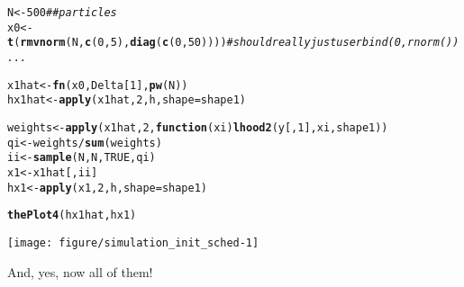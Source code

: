 \documentclass[11pt]{article}\usepackage[]{graphicx}\usepackage[]{color}
\makeatletter
\def\maxwidth{ %
  \ifdim\Gin@nat@width>\linewidth
    \linewidth
  \else
    \Gin@nat@width
  \fi
}
\newcommand{\hlnum}[1]{\textcolor[rgb]{0.686,0.059,0.569}{#1}}%
\newcommand{\hlcom}[1]{\textcolor[rgb]{0.678,0.584,0.686}{\textit{#1}}}%
\newcommand{\hlopt}[1]{\textcolor[rgb]{0,0,0}{#1}}%
\newcommand{\hlstd}[1]{\textcolor[rgb]{0.345,0.345,0.345}{#1}}%
\newcommand{\hlkwa}[1]{\textcolor[rgb]{0.161,0.373,0.58}{\textbf{#1}}}%
\newcommand{\hlkwb}[1]{\textcolor[rgb]{0.69,0.353,0.396}{#1}}%
\newcommand{\hlkwc}[1]{\textcolor[rgb]{0.333,0.667,0.333}{#1}}%
\newcommand{\hlkwd}[1]{\textcolor[rgb]{0.737,0.353,0.396}{\textbf{#1}}}%
\newenvironment{kframe}{%
 \def\at@end@of@kframe{}%
 \ifinner\ifhmode%
  \def\at@end@of@kframe{\end{minipage}}%
  \begin{minipage}{\columnwidth}%
 \fi\fi%
 \def\FrameCommand##1{\hskip\@totalleftmargin \hskip-\fboxsep
 \colorbox{shadecolor}{##1}\hskip-\fboxsep
     \hskip-\linewidth \hskip-\@totalleftmargin \hskip\columnwidth}%
 \MakeFramed {\advance\hsize-\width
   \@totalleftmargin\z@ \linewidth\hsize
   \@setminipage}}%
 {\par\unskip\endMakeFramed%
 \at@end@of@kframe}
\newenvironment{knitrout}{}{} %
\makeatother
\begin{document}
\begin{knitrout}
\begin{kframe}
\begin{alltt}
\hlstd{N} \hlkwb{<-} \hlnum{500} \hlcom{## particles}
\hlstd{x0} \hlkwb{<-} \hlkwd{t}\hlstd{(}\hlkwd{rmvnorm}\hlstd{(N,} \hlkwd{c}\hlstd{(}\hlnum{0}\hlstd{,} \hlnum{5}\hlstd{),} \hlkwd{diag}\hlstd{(}\hlkwd{c}\hlstd{(}\hlnum{0}\hlstd{,} \hlnum{50}\hlstd{))))} \hlcom{# should really just use rbind(0, rnorm()) ...}

\hlstd{x1hat} \hlkwb{<-} \hlkwd{fn}\hlstd{(x0, Delta[}\hlnum{1}\hlstd{],} \hlkwd{pw}\hlstd{(N))}
\hlstd{hx1hat} \hlkwb{<-} \hlkwd{apply}\hlstd{(x1hat,} \hlnum{2}\hlstd{, h,} \hlkwc{shape} \hlstd{= shape1)}

\hlstd{weights} \hlkwb{<-} \hlkwd{apply}\hlstd{(x1hat,} \hlnum{2}\hlstd{,} \hlkwa{function}\hlstd{(}\hlkwc{xi}\hlstd{)} \hlkwd{lhood2}\hlstd{(y[,} \hlnum{1}\hlstd{], xi, shape1))}
\hlstd{qi} \hlkwb{<-} \hlstd{weights} \hlopt{/} \hlkwd{sum}\hlstd{(weights)}
\hlstd{ii} \hlkwb{<-} \hlkwd{sample}\hlstd{(N, N,} \hlnum{TRUE}\hlstd{, qi)}
\hlstd{x1} \hlkwb{<-} \hlstd{x1hat[, ii]}
\hlstd{hx1} \hlkwb{<-} \hlkwd{apply}\hlstd{(x1,} \hlnum{2}\hlstd{, h,} \hlkwc{shape} \hlstd{= shape1)}

\hlkwd{thePlot4}\hlstd{(hx1hat, hx1)}
\end{alltt}
\end{kframe}

{\centering \texttt{[image: figure/simulation\_init\_sched-1]} 

}



\end{knitrout}

And, yes, now all of them!
\end{document}

